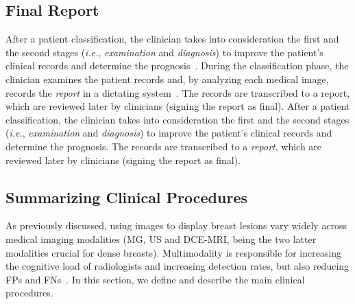 
\subsection{Final Report}
\label{sec:chap002005003}

After a patient classification, the clinician takes into consideration the first and the second stages ({\it i.e.}, {\it examination} and {\it diagnosis}) to improve the patient's clinical records and determine the prognosis~\cite{segrelles2017increasing}.
During the classification phase, the clinician examines the patient records and, by analyzing each medical image, records the {\it report} in a dictating system~\cite{SENG202079}.
The records are transcribed to a report, which are reviewed later by clinicians (signing the report as final).
After a patient classification, the clinician takes into consideration the first and the second stages ({\it i.e.}, {\it examination} and {\it diagnosis}) to improve the patient's clinical records and determine the prognosis.
The records are transcribed to a {\it report}, which are reviewed later by clinicians (signing the report as final).

\subsection{Summarizing Clinical Procedures}
\label{sec:chap002005004}

As previously discussed, using images to display breast lesions vary widely across medical imaging modalities (\ac{MG}, \ac{US} and \ac{DCE}-\ac{MRI}, being the two latter modalities crucial for dense breasts).
Multimodality is responsible for increasing the cognitive load of radiologists and increasing detection rates, but also reducing \acp{FP} and \acp{FN}~\cite{cheung2017integral}.
In this section, we define and describe the main clinical procedures.

